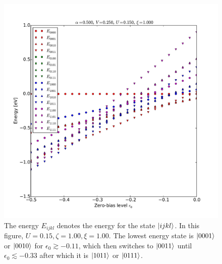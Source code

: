 \begin{figure}[!bt]
    \centering
    \includegraphics[height=.45\textheight]{pdf/energy/pespin_distribution_u2_k2.pdf}
    \caption{The energy $E_{ijkl}$ denotes the energy for the state $\ket{ijkl}$. In this figure, $U=0.15, \zeta=1.00, \xi=1.00$. The lowest energy state is $\ket{0001}$ or $\ket{0010}$ for $\epsilon_0\gtrsim -0.11$, which then switches to $\ket{0011}$ until $\epsilon_0\lesssim -0.33$ after which it is $\ket{1011}$ or $\ket{0111}$.}
    \label{fig:perspinenergy22}
\end{figure} 
